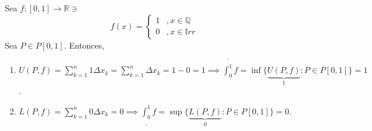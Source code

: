 \begin{ejemplo}
	Sea $f:[0,1]\to\mathbb{R}\ni$
	$$f(x)=\begin{cases}
		1&, x\in\mathbb{Q}\\
		0&, x\in \mathbb{I}rr
	\end{cases}$$
Sea $P\in P[0,1]$. Entonces, 
\begin{enumerate}
	\item $U(P,f)=\sum_{k=1}^{n}1\Delta x_k=\sum_{k=1}^{n}\Delta x_k=1-0=1\implies \overline{\int_0^1}f=\inf\{\underbrace{U(P,f)}_1:P\in P[0,1]\}=1$.
	\item $L(P,f)=\sum_{k=1}^{n}0\Delta x_k=0\implies \underline{\int_0^1}f=\sup\{\underbrace{L(P,f)}_0:P\in P[0,1]\}=0$. 
\end{enumerate}
\end{ejemplo}



